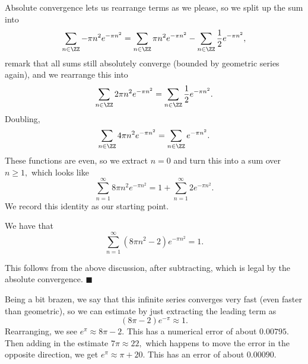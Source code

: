 Absolute convergence lets us rearrange terms as we please, so we split up the sum into
\[\sum_{n\in\ZZ}-\pi n^2e^{-\pi n^2}=\sum_{n\in\ZZ}\pi n^2e^{-\pi n^2}-\sum_{n\in\ZZ}\frac12e^{-\pi n^2},\]
remark that all sums still absolutely converge (bounded by geometric series again), and we rearrange this into
\[\sum_{n\in\ZZ}2\pi n^2e^{-\pi n^2}=\sum_{n\in\ZZ}\frac12e^{-\pi n^2}.\]
Doubling,
\[\sum_{n\in\ZZ}4\pi n^2e^{-\pi n^2}=\sum_{n\in\ZZ}e^{-\pi n^2}.\]
These functions are even, so we extract $n=0$ and turn this into a sum over $n\ge1,$ which looks like
\[\sum_{n=1}^\infty8\pi n^2e^{-\pi n^2}=1+\sum_{n=1}^\infty2e^{-\pi n^2}.\]
We record this identity as our starting point.
\begin{lemma}
    We have that
    \[\sum_{n=1}^\infty\left(8\pi n^2-2\right)e^{-\pi n^2}=1.\]
\end{lemma}
This follows from the above discussion, after subtracting, which is legal by the absolute convergence. $\blacksquare$

Being a bit brazen, we say that this infinite series converges very fast (even faster than geometric), so we can estimate by just extracting the leading term as
\[(8\pi-2)e^{-\pi}\approx1.\]
Rearranging, we see $e^\pi\approx8\pi-2.$ This has a numerical error of about $0.00795.$ Then adding in the estimate $7\pi\approx22,$ which happens to move the error in the opposite direction, we get $e^\pi\approx\pi+20.$ This has an error of about $0.00090.$

